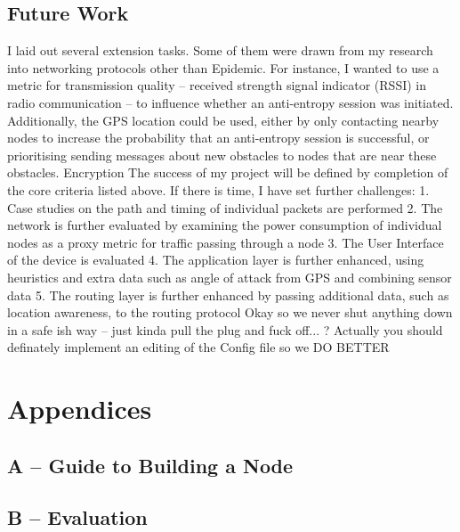 \documentclass[12pt,a4paper]{report}
\begin{document}
\section{Future Work}
I laid out several extension tasks. Some of them were drawn from my research into networking protocols other than Epidemic. For instance, I wanted to use a metric for transmission quality -- received strength signal indicator (RSSI) in radio communication -- to influence whether an anti-entropy session was initiated. Additionally, the GPS location could be used, either by only contacting nearby nodes to increase the probability that an anti-entropy session is successful, or prioritising sending messages about new obstacles to nodes that are near these obstacles. 
Encryption 
The success of my project will be defined by completion of the core criteria listed above. If there is
time, I have set further challenges:
1. Case studies on the path and timing of individual packets are performed
2. The network is further evaluated by examining the power consumption of individual nodes as
a proxy metric for traffic passing through a node
3. The User Interface of the device is evaluated
4. The application layer is further enhanced, using heuristics and extra data such as angle of
attack from GPS and combining sensor data
5. The routing layer is further enhanced by passing additional data, such as location awareness,
to the routing protocol
Okay so we never shut anything down in a safe ish way -- just kinda pull the plug and fuck off... ? Actually you should definately implement an editing of the Config file so we DO BETTER


%


\chapter*{Appendices}

\section*{A -- Guide to Building a Node}
\label{appendixA}
\setcounter{chapter}{0}
\setcounter{figure}{0}

\newpage
\section*{B -- Evaluation}
\label{appendixB}
\setcounter{figure}{0}

\end{document}
